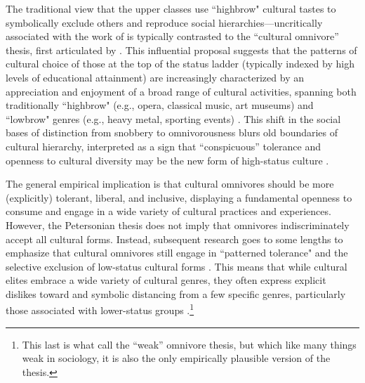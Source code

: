 \documentclass[12pt]{article}
\begin{document}
The traditional view that the upper classes use ``highbrow" cultural tastes to symbolically exclude others and reproduce social hierarchies---uncritically associated with the work of \citep{bourdieu1984distinction-835} is typically contrasted to the ``cultural omnivore'' thesis, first articulated by \citet{peterson1992understanding-ce3}. This influential proposal suggests that the patterns of cultural choice of those at the top of the status ladder (typically indexed by high levels of educational attainment) are increasingly characterized by an appreciation and enjoyment of a broad range of cultural activities, spanning both traditionally ``highbrow" (e.g., opera, classical music, art museums) and ``lowbrow" genres (e.g., heavy metal, sporting events) \citep{peterson1996changing-967, goldberg2011mapping-77a, lizardo2012reconceptualizing-8ff}. This shift in the social bases of distinction from snobbery to omnivorousness blurs old boundaries of cultural hierarchy, interpreted as a sign that ``conspicuous'' tolerance and openness to cultural diversity may be the new form of high-status culture \citep{ollivier2008modes-96f}. 

The general empirical implication is that cultural omnivores should be more (explicitly) tolerant, liberal, and inclusive, displaying a fundamental openness to consume and engage in a wide variety of cultural practices and experiences. However, the Petersonian thesis does not imply that omnivores indiscriminately accept all cultural forms. Instead, subsequent research goes to some lengths to emphasize that cultural omnivores still engage in ``patterned tolerance" and the selective exclusion of low-status cultural forms \citep{bryson1996anything-311, lindblom2019anything-530, warde2008omnivorous-e77, prieur2008cultural-0db}. This means that while cultural elites embrace a wide variety of cultural genres, they often express explicit dislikes toward and symbolic distancing from a few specific genres, particularly those associated with lower-status groups \citep{bryson1996anything-311, lindblom2022growing-ded}.\footnote{This last is what \citet{vries2022what-1a2} call the ``weak'' omnivore thesis, but which like many things weak in sociology, it is also the only empirically plausible version of the thesis.}
\end{document}
